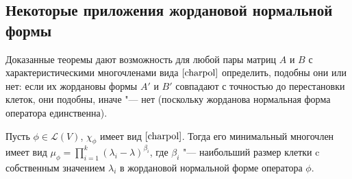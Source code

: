 \subsection{Некоторые приложения жордановой нормальной формы}

\begin{note}
	Доказанные теоремы дают возможность для любой пары матриц $A$ и $B$ с характеристическими многочленами вида $\eqref*{charpol}$ определить, подобны они или нет: если их жордановы формы $A'$ и $B'$ совпадают с точностью до перестановки клеток, они подобны, иначе "--- нет (поскольку жорданова нормальная форма оператора единственна).
\end{note}

\begin{proposition}
	Пусть $\phi \in \mathcal{L}(V)$, $\chi_\phi$ имеет вид $\eqref*{charpol}$. Тогда его минимальный многочлен имеет вид $\mu_\phi = \prod_{i = 1}^{k}(\lambda_i - \lambda)^{\beta_i}$,
	где $\beta_i$ "--- наибольший размер клетки c собственным значением $\lambda_i$ в жордановой нормальной форме оператора $\phi$.
\end{proposition}

